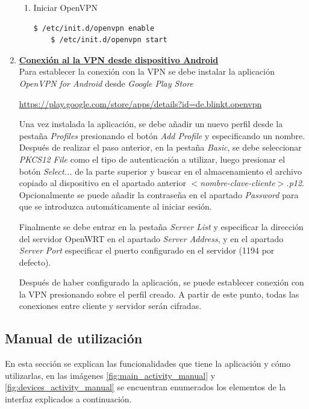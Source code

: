 \documentclass[12pt, twoside]{article}
\begin{document}
\begin{enumerate}
\begin{enumerate}
                        \item Iniciar OpenVPN
                        \begin{lstlisting}[language=bash]
    $ /etc/init.d/openvpn enable
    $ /etc/init.d/openvpn start
                        \end{lstlisting}
                    \end{enumerate}

                \item \textbf{\underline{Conexión al la VPN desde dispositivo Android}} \\
                Para establecer la conexión con la VPN se debe instalar la aplicación \textit{OpenVPN for Android} desde \textit{Google Play Store}
                
                \url{https://play.google.com/store/apps/details?id=de.blinkt.openvpn}

                Una vez instalada la aplicación, se debe añadir un nuevo perfil desde la pestaña \textit{Profiles} presionando el botón \textit{Add Profile} y especificando un nombre. Después de realizar el paso anterior, en la pestaña \textit{Basic}, se debe seleccionar \textit{PKCS12 File} como el tipo de autenticación a utilizar, luego presionar el botón \textit{Select...} de la parte superior y buscar en el almacenamiento el archivo copiado al dispositivo en el apartado anterior \textit{$<$nombre-clave-cliente$>$.p12}. Opcionalmente se puede añadir la contraseña en el apartado \textit{Password} para que se introduzca automáticamente al iniciar sesión.

                Finalmente se debe entrar en la pestaña \textit{Server List} y especificar la dirección del servidor OpenWRT en el apartado \textit{Server Address}, y en el apartado \textit{Server Port} especificar el puerto configurado en el servidor (1194 por defecto).

                Después de haber configurado la aplicación, se puede establecer conexión con la VPN presionando sobre el perfil creado. A partir de este punto, todas las conexiones entre cliente y servidor serán cifradas.
            \end{enumerate}

    \subsection{Manual de utilización}
        En esta sección se explican las funcionalidades que tiene la aplicación y cómo utilizarlas, en las imágenes \ref{fig:main_activity_manual} y \ref{fig:devices_activity_manual} se encuentran enumerados los elementos de la interfaz explicados a continuación.
\end{document}
